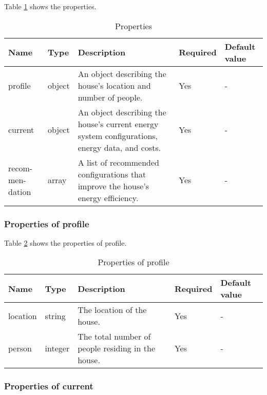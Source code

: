 Table \ref{tab:properties} shows the properties. 
\begin{table}[h!]
    \centering
    \small
    \begin{tabular}{ | p{} | p{} | p{} | p{} | p{} | } 
      \hline
      Name & Type & Description & Required & Default value \\
      \hline
      profile & object & An object describing the house's location and number of people. & Yes & - \\
      \hline
      current & object & An object describing the house's current energy system configurations, energy data, and costs. & Yes & - \\
      \hline
      recom-men-dation & array & A list of recommended configurations that improve the house's energy efficiency. & Yes & - \\
      \hline
    \end{tabular}
    \caption{Properties}
    \label{tab:properties}
\end{table}


\subsubsection{Properties of profile}

Table \ref{tab:properties_profile} shows the properties of profile. 
\begin{table}[h!]
    \centering
    \small
    \begin{tabular}{ | p{} | p{} | p{} | p{} | p{} | } 
    \hline
    Name & Type & Description & Required & Default value \\
    \hline
    location & string & The location of the house. & Yes & - \\
    \hline
    person & integer & The total number of people residing in the house. & Yes & - \\
    \hline
    \end{tabular}
    \caption{Properties of profile}
    \label{tab:properties_profile}
\end{table}


\subsubsection{Properties of current}

